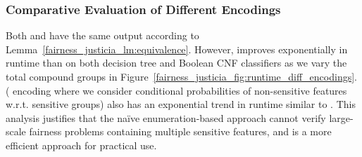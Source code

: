 \subsubsection{Comparative Evaluation of Different Encodings}
Both {\justiciaenum} and {\justicialearn}  have the same output according to Lemma~\ref{fairness_justicia_lm:equivalence}. However, {\justicialearn}  improves exponentially  in runtime  than {\justiciaenum} on both decision tree and Boolean CNF classifiers as we vary the total compound groups in Figure~\ref{fairness_justicia_fig:runtime_diff_encodings}. {\justiciacond} ({\justiciaenum} encoding where we consider conditional probabilities of non-sensitive features w.r.t. sensitive groups) also has an exponential trend in runtime similar to {\justiciaenum}.  This analysis justifies that the na\"ive enumeration-based approach cannot verify large-scale fairness problems containing multiple sensitive features, and {\justicialearn} is a more efficient approach for practical use.









